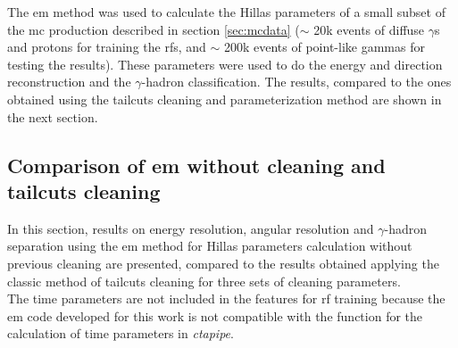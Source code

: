 \documentclass[main.tex]{subfiles}
\begin{document}
The \gls{em} method was used to calculate the Hillas parameters of a small subset of the \gls{mc} production described in section \ref{sec:mcdata} ($\sim$ 20k events of diffuse $\gamma$s and protons for training the \gls{rf}s, and $\sim$ 200k events of point-like gammas for testing the results). These parameters were used to do the energy and direction reconstruction and the $\gamma$-hadron classification. The results, compared to the ones obtained using the tailcuts cleaning and parameterization method are shown in the next section.

\subsection{Comparison of \gls{em} without cleaning and tailcuts cleaning}

In this section, results on energy resolution, angular resolution and $\gamma$-hadron separation using the \gls{em} method for Hillas parameters calculation without previous cleaning are presented, compared to the results obtained applying the classic method of tailcuts cleaning for  three sets of cleaning parameters.\\
The time parameters are not included in the features for \gls{rf} training because
 the \gls{em} code developed for this work is not compatible with the function for the calculation of time parameters in \textit{ctapipe}. 
\end{document}
